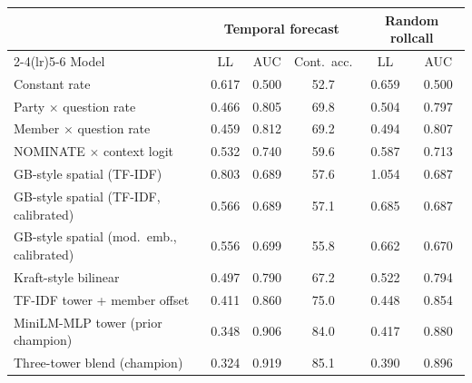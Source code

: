 \begin{tabular}{lccccc}
\toprule
\multicolumn{1}{l}{} & \multicolumn{3}{c}{Temporal forecast} & \multicolumn{2}{c}{Random rollcall} \\
\cmidrule(lr){2-4}\cmidrule(lr){5-6}
Model & LL & AUC & Cont.\ acc. & LL & AUC \\
\midrule
Constant rate & 0.617 & 0.500 & 52.7 & 0.659 & 0.500 \\
Party $\times$ question rate & 0.466 & 0.805 & 69.8 & 0.504 & 0.797 \\
Member $\times$ question rate & 0.459 & 0.812 & 69.2 & 0.494 & 0.807 \\
NOMINATE $\times$ context logit & 0.532 & 0.740 & 59.6 & 0.587 & 0.713 \\
GB-style spatial (TF-IDF) & 0.803 & 0.689 & 57.6 & 1.054 & 0.687 \\
GB-style spatial (TF-IDF, calibrated) & 0.566 & 0.689 & 57.1 & 0.685 & 0.687 \\
GB-style spatial (mod.\ emb., calibrated) & 0.556 & 0.699 & 55.8 & 0.662 & 0.670 \\
Kraft-style bilinear & 0.497 & 0.790 & 67.2 & 0.522 & 0.794 \\
TF-IDF tower + member offset & 0.411 & 0.860 & 75.0 & 0.448 & 0.854 \\
MiniLM-MLP tower (prior champion) & 0.348 & 0.906 & 84.0 & 0.417 & 0.880 \\
Three-tower blend (champion) & 0.324 & 0.919 & 85.1 & 0.390 & 0.896 \\
\bottomrule
\end{tabular}
